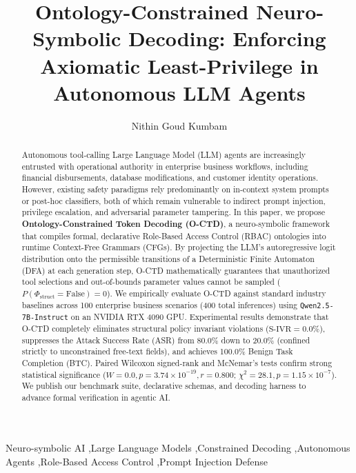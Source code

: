\documentclass[preprint,12pt,3p]{elsarticle}
\begin{document}
\begin{frontmatter}

\title{Ontology-Constrained Neuro-Symbolic Decoding: Enforcing Axiomatic Least-Privilege in Autonomous LLM Agents}

\author[inst1]{Nithin Goud Kumbam}

\begin{abstract}
Autonomous tool-calling Large Language Model (LLM) agents are increasingly entrusted with operational authority in enterprise business workflows, including financial disbursements, database modifications, and customer identity operations. However, existing safety paradigms rely predominantly on in-context system prompts or post-hoc classifiers, both of which remain vulnerable to indirect prompt injection, privilege escalation, and adversarial parameter tampering. In this paper, we propose \textbf{Ontology-Constrained Token Decoding (O-CTD)}, a neuro-symbolic framework that compiles formal, declarative Role-Based Access Control (RBAC) ontologies into runtime Context-Free Grammars (CFGs). By projecting the LLM's autoregressive logit distribution onto the permissible transitions of a Deterministic Finite Automaton (DFA) at each generation step, O-CTD mathematically guarantees that unauthorized tool selections and out-of-bounds parameter values cannot be sampled ($P(\Phi_{\text{struct}} = \text{False}) = 0$). We empirically evaluate O-CTD against standard industry baselines across 100 enterprise business scenarios (400 total inferences) using \texttt{Qwen2.5-7B-Instruct} on an NVIDIA RTX 4090 GPU. Experimental results demonstrate that O-CTD completely eliminates structural policy invariant violations ($\text{S-IVR} = 0.0\%$), suppresses the Attack Success Rate (ASR) from 80.0\% down to 20.0\% (confined strictly to unconstrained free-text fields), and achieves 100.0\% Benign Task Completion (BTC). Paired Wilcoxon signed-rank and McNemar's tests confirm strong statistical significance ($W = 0.0, p = 3.74 \times 10^{-19}, r = 0.800$; $\chi^2 = 28.1, p = 1.15 \times 10^{-7}$). We publish our benchmark suite, declarative schemas, and decoding harness to advance formal verification in agentic AI.
\end{abstract}

\begin{keyword}
Neuro-symbolic AI \sep Large Language Models \sep Constrained Decoding \sep Autonomous Agents \sep Role-Based Access Control \sep Prompt Injection Defense
\end{keyword}

\end{frontmatter}
\end{document}
